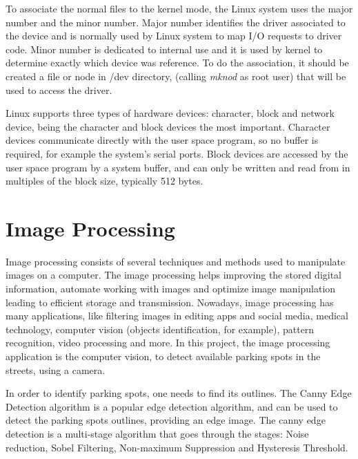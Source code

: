 To associate the normal files to the kernel mode, the Linux system uses the major number and the minor number. Major number identifies the driver associated to the device and is normally used by Linux system to map I/O requests to driver code. Minor number is dedicated to internal use and it is used by kernel to determine exactly which device was reference. To do the association, it should be created a file or node in /dev directory, (calling \textit{mknod} as root user) that will be used to access the driver.

Linux supports three types of hardware devices: character, block and network device, being the character and block devices the most important. Character devices communicate directly with the user space program, so no buffer is required, for example the system’s serial ports. Block devices are accessed by the user space program by a system buffer, and can only be written and read from in multiples of the block size, typically 512 bytes. \cite{linux_progr_interface}

\clearpage
\section{Image Processing}

Image processing consists of several techniques and methods used to manipulate images on a computer. The image processing helps improving the stored digital information, automate working with images and optimize image manipulation leading to efficient storage and transmission. Nowadays, image processing has many applications, like filtering images in editing apps and social media, medical technology, computer vision (objects identification, for example), pattern recognition, video processing and more. In this project, the image processing application is the computer vision, to detect available parking spots in the streets, using a camera.

In order to identify parking spots, one needs to find its outlines. The Canny Edge Detection \cite{canny} algorithm is a popular edge detection algorithm, and can be used to detect the parking spots outlines, providing an edge image. The canny edge detection is a multi-stage algorithm that goes through the stages: Noise reduction, Sobel Filtering, Non-maximum Suppression and Hysteresis Threshold.

